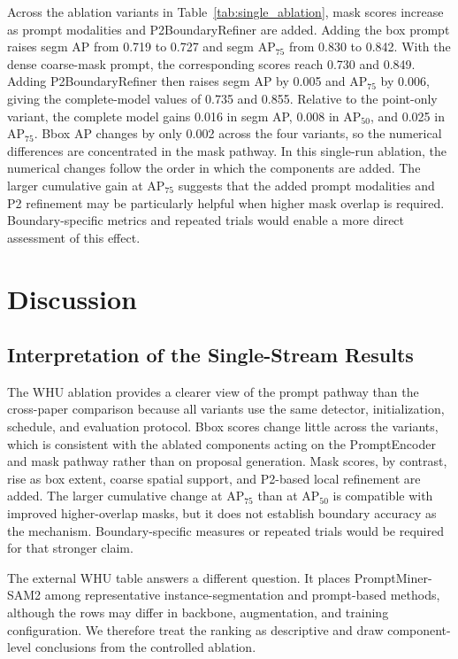 \documentclass[letterpaper,journal]{IEEEtran}
\begin{document}
Across the ablation variants in Table~\ref{tab:single_ablation}, mask scores increase as prompt
modalities and P2BoundaryRefiner are added. Adding the box prompt raises segm AP from 0.719 to
0.727 and segm AP$_{75}$ from 0.830 to 0.842. With the dense coarse-mask prompt, the
corresponding scores reach 0.730 and 0.849. Adding P2BoundaryRefiner then raises segm AP by
0.005 and AP$_{75}$ by 0.006, giving the complete-model values of 0.735 and 0.855. Relative to
the point-only variant, the complete model gains 0.016 in segm AP, 0.008 in AP$_{50}$, and
0.025 in AP$_{75}$. Bbox AP changes by only 0.002 across the four variants, so the numerical
differences are concentrated in the mask pathway. In this single-run ablation, the numerical
changes follow the order in which the components are added. The larger cumulative gain at
AP$_{75}$ suggests that the added prompt modalities and P2 refinement may be particularly
helpful when higher mask overlap is required. Boundary-specific metrics and repeated trials
would enable a more direct assessment of this effect.

\section{Discussion}
\label{sec:discussion}

\subsection{Interpretation of the Single-Stream Results}
The WHU ablation provides a clearer view of the prompt pathway than the cross-paper comparison
because all variants use the same detector, initialization, schedule, and evaluation protocol.
Bbox scores change little across the variants, which is consistent with the ablated components
acting on the PromptEncoder and mask pathway rather than on proposal generation. Mask scores,
by contrast, rise as box extent, coarse spatial support, and P2-based local refinement are
added. The larger cumulative change at AP$_{75}$ than at AP$_{50}$ is compatible with improved
higher-overlap masks, but it does not establish boundary accuracy as the mechanism.
Boundary-specific measures or repeated trials would be required for that stronger claim.

The external WHU table answers a different question. It places PromptMiner-SAM2 among
representative instance-segmentation and prompt-based methods, although the rows may differ in
backbone, augmentation, and training configuration. We therefore treat the ranking as
descriptive and draw component-level conclusions from the controlled ablation.
\end{document}
